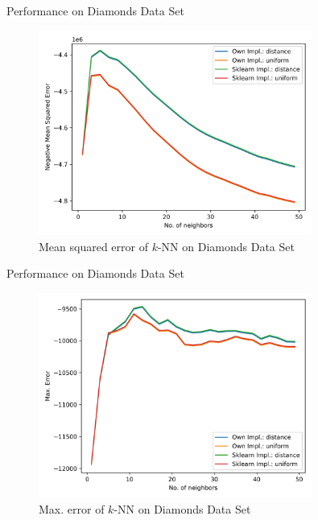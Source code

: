 \documentclass[10pt]{beamer}
\begin{document}
    \begin{frame}{Performance on Diamonds Data Set}
        \begin{figure}[h!]
            \centering
            \includegraphics[width=0.8\textwidth]{exercise_2/presentation/figures/diamond_knn_scores_mean_sq_err.png}
            \caption{Mean squared error of $k$-NN on Diamonds Data Set}
            \label{fig:kNN_Diamond_MSE}
       \end{figure}
    \end{frame}
    
    \begin{frame}{Performance on Diamonds Data Set}
        \begin{figure}[h!]
            \centering
            \includegraphics[width=0.8\textwidth]{exercise_2/presentation/figures/diamond_knn_scores_max_error.png}
            \caption{Max. error of $k$-NN on Diamonds Data Set}
            \label{fig:kNN_Diamond_max-error}
       \end{figure}
    \end{frame}
    
\end{document}
